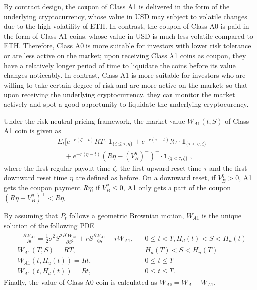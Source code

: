 \documentclass[11pt]{article}%
\numberwithin{equation}{section}
\theoremstyle{plain}
\begin{document}
\begin{appendices}
By contract design, the coupon of Class A1 is delivered in the form of the underlying cryptocurrency, whose value in USD may subject to volatile changes due to the high volatility of ETH. In contrast, the coupon of Class A0 is paid in the form of Class A1 coins, whose value in USD is much less volatile compared to ETH. Therefore, Class A0 is more suitable for investors with lower risk tolerance or are less active on the market; upon receiving Class A1 coins as coupon, they have a relatively longer period of time to liquidate the coins before its value changes noticeably. In contrast, Class A1 is more suitable for investors who are willing to take certain degree of risk and are more active on the market; so that upon receiving the underlying cryptocurrency, they can monitor the market actively and spot a good opportunity to liquidate the underlying cryptocurency.


Under the risk-neutral pricing framework, the market value $W_{A1}(t,S)$ of Class A1 coin is given as
\begin{align*}
 & E_{t}\Bigg[e^{-r(\zeta-t)}RT\cdot\mathbf{1}_{\{\zeta\le\tau,\eta\}}+e^{-r(\tau-t)}R\tau\cdot\mathbf{1}_{\{\tau<\eta,\zeta\}}\\
 &\quad+e^{-r(\eta-t)}(R\eta-(V_B^{\eta})^-)^+\cdot\mathbf{1}_{\{\eta<\tau,\zeta\}}\Bigg],
\end{align*}
where the first regular payout time $\zeta$, the first upward reset time $\tau$ and the first downward reset time $\eta$ are defined as before. On a downward reset, if $V_B^{\eta}>0$, A1 gets the coupon payment $R\eta$; if $V_B^{\eta}\le 0$, A1 only gets a part of the coupon $(R\eta+V_B^{\eta})^+ < R\eta$.

By assuming that $P_t$ follows a geometric Brownian motion, $W_{A1}$ is the unique solution of the following PDE
\begin{align*}
&-\frac{\partial W_{A1}}{\partial t}  =\frac{1}{2}\sigma^{2}S^{2}\frac{\partial^{2}W_{A1}}{\partial S^{2}}+r S\frac{\partial W_{A1}}{\partial S}-r W_{A1},&&0\le t<T, H_d(t)<S<H_u(t)\\
&W_{A1}(T,S)  =RT,&&H_d(T)<S<H_u(T)\\
&W_{A1}(t,H_{u}(t))  =Rt,&&0\le t\le T\\
&W_{A1}(t,H_d(t))  =Rt,&&0\le t\le T.
\end{align*}
Finally, the value of Class A0 coin is calculated as $W_{A0}=W_A-W_{A1}$.



\end{appendices}
\end{document}
